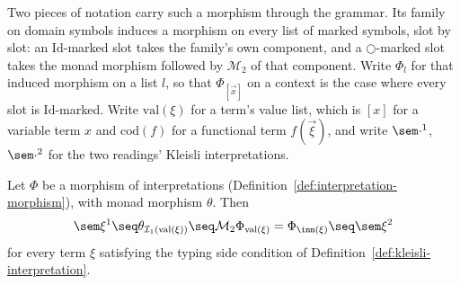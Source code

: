 Two pieces of notation carry such a morphism through the grammar. Its
family on domain symbols induces a morphism on every list of marked
symbols, slot by slot: an $\mathrm{Id}$-marked slot takes the family's own
component, and a $\bigcirc$-marked slot takes the monad morphism followed by
$\mathcal M_2$ of that component. Write $\Phi_l$ for that induced morphism
on a list $l$, so that $\Phi_{[\vec x]}$ on a context is the case where
every slot is $\mathrm{Id}$-marked. Write $\mathrm{val}(\xi)$ for a term's
value list, which is $[x]$ for a variable term $x$ and $\mathrm{cod}(f)$
for a functional term $f(\vec\xi)$, and write $\sem\cdot^1$, $\sem\cdot^2$
for the two readings' Kleisli interpretations.

\begin{lemma}
\label{lem:kleisli-term-natural}
\leanok
Let $\Phi$ be a morphism of interpretations
(Definition~\ref{def:interpretation-morphism}), with monad morphism
$\theta$. Then
\[
  \sem\xi^1 \seq \theta_{\mathcal I_1(\mathrm{val}(\xi))} \seq
  \mathcal M_2\Phi_{\mathrm{val}(\xi)} = \Phi_{\inn(\xi)} \seq \sem\xi^2
\]
for every term $\xi$ satisfying the typing side condition of
Definition~\ref{def:kleisli-interpretation}.
\end{lemma}

